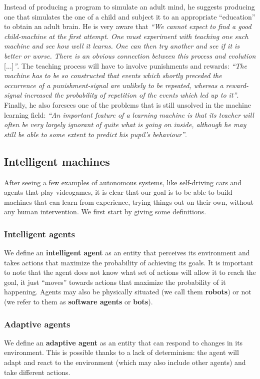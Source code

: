 Instead of producing a program to simulate an adult mind, he suggests producing one that simulates the one of a child and subject it to an appropriate ``education'' to obtain an adult brain. He is very aware that \textit{``We cannot expect to find a good child-machine at the first attempt. One must experiment with teaching one such machine and see how well it learns. One can then try another and see if it is better or worse. There is an obvious connection between this process and evolution} [...]\textit{''}. The teaching process will have to involve punishments and rewards: \textit{``The machine has to be so constructed that events which shortly preceded the occurrence of a punishment-signal are unlikely to be repeated, whereas a reward-signal increased the probability of
repetition of the events which led up to it''}. Finally, he also foresees one of the problems that is still unsolved in the machine learning field: \textit{``An important feature of a learning machine is that its teacher will often be very largely ignorant of quite what is going on inside, although he may
still be able to some extent to predict his pupil’s behaviour''}.

\subsection{Intelligent machines}
After seeing a few examples of autonomous systems, like self-driving cars and agents that play videogames, it is clear that our goal is to be able to build machines that can learn from experience, trying things out on their own, without any human intervention. We first start by giving some definitions.

\subsubsection{Intelligent agents}
We define an \textbf{intelligent agent} as an entity that perceives its environment and takes actions that maximize the probability of achieving its goals. It is important to note that the agent does not know what set of actions will allow it to reach the goal, it just ``moves'' towards actions that maximize the probability of it happening. Agents may also be physically situated (we call them \textbf{robots}) or not (we refer to them as \textbf{software agents} or \textbf{bots}).

\subsubsection{Adaptive agents}
We define an \textbf{adaptive agent} as an entity that can respond to changes in its environment. This is possible thanks to a lack of determinism: the agent will adapt and react to the environment (which may also include other agents) and take different actions.

